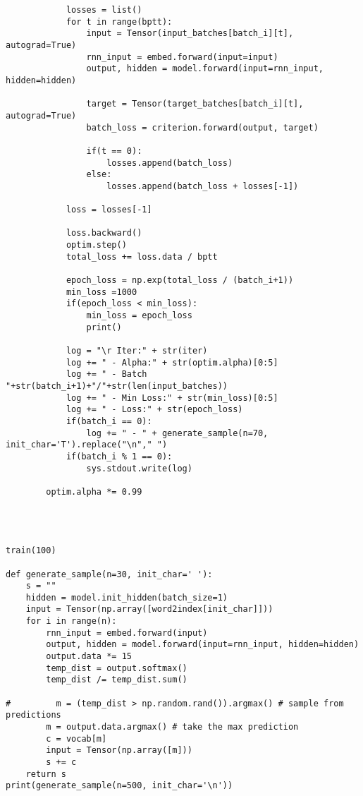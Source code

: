 \documentclass[12pt]{article}
\begin{document}
\begin{verbatim}
            losses = list()
            for t in range(bptt):
                input = Tensor(input_batches[batch_i][t], autograd=True)
                rnn_input = embed.forward(input=input)
                output, hidden = model.forward(input=rnn_input, hidden=hidden)

                target = Tensor(target_batches[batch_i][t], autograd=True)    
                batch_loss = criterion.forward(output, target)

                if(t == 0):
                    losses.append(batch_loss)
                else:
                    losses.append(batch_loss + losses[-1])

            loss = losses[-1]

            loss.backward()
            optim.step()
            total_loss += loss.data / bptt

            epoch_loss = np.exp(total_loss / (batch_i+1))
            min_loss =1000
            if(epoch_loss < min_loss):
                min_loss = epoch_loss
                print()

            log = "\r Iter:" + str(iter)
            log += " - Alpha:" + str(optim.alpha)[0:5]
            log += " - Batch "+str(batch_i+1)+"/"+str(len(input_batches))
            log += " - Min Loss:" + str(min_loss)[0:5]
            log += " - Loss:" + str(epoch_loss)
            if(batch_i == 0):
                log += " - " + generate_sample(n=70, init_char='T').replace("\n"," ")
            if(batch_i % 1 == 0):
                sys.stdout.write(log)

        optim.alpha *= 0.99




train(100)

def generate_sample(n=30, init_char=' '):
    s = ""
    hidden = model.init_hidden(batch_size=1)
    input = Tensor(np.array([word2index[init_char]]))
    for i in range(n):
        rnn_input = embed.forward(input)
        output, hidden = model.forward(input=rnn_input, hidden=hidden)
        output.data *= 15
        temp_dist = output.softmax()
        temp_dist /= temp_dist.sum()

#         m = (temp_dist > np.random.rand()).argmax() # sample from predictions
        m = output.data.argmax() # take the max prediction
        c = vocab[m]
        input = Tensor(np.array([m]))
        s += c
    return s
print(generate_sample(n=500, init_char='\n'))


\end{verbatim}
\end{document}
